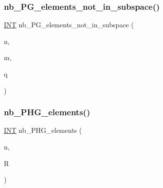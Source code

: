 \mbox{\label{projective_8_c_a3d91cd5837ab4c11dce288f616fb8a9b}} 
\subsubsection{\texorpdfstring{nb\+\_\+\+P\+G\+\_\+elements\+\_\+not\+\_\+in\+\_\+subspace()}{nb\_PG\_elements\_not\_in\_subspace()}}
{\footnotesize\ttfamily \mbox{\hyperlink{galois_8h_a09fddde158a3a20bd2dcadb609de11dc}{I\+NT}} nb\+\_\+\+P\+G\+\_\+elements\+\_\+not\+\_\+in\+\_\+subspace (\begin{DoxyParamCaption}\item[{\mbox{\hyperlink{galois_8h_a09fddde158a3a20bd2dcadb609de11dc}{I\+NT}}}]{n,  }\item[{\mbox{\hyperlink{galois_8h_a09fddde158a3a20bd2dcadb609de11dc}{I\+NT}}}]{m,  }\item[{\mbox{\hyperlink{galois_8h_a09fddde158a3a20bd2dcadb609de11dc}{I\+NT}}}]{q }\end{DoxyParamCaption})}

\mbox{\label{projective_8_c_a26b75077f8a14342d9a3b0800cf27edc}} 
\subsubsection{\texorpdfstring{nb\+\_\+\+P\+H\+G\+\_\+elements()}{nb\_PHG\_elements()}}
{\footnotesize\ttfamily \mbox{\hyperlink{galois_8h_a09fddde158a3a20bd2dcadb609de11dc}{I\+NT}} nb\+\_\+\+P\+H\+G\+\_\+elements (\begin{DoxyParamCaption}\item[{\mbox{\hyperlink{galois_8h_a09fddde158a3a20bd2dcadb609de11dc}{I\+NT}}}]{n,  }\item[{\mbox{\hyperlink{classfinite__ring}{finite\+\_\+ring}} \&}]{R }\end{DoxyParamCaption})}

\mbox{\label{projective_8_c_af28ff9535eb00a325309e1a15e7e2be7}} 
